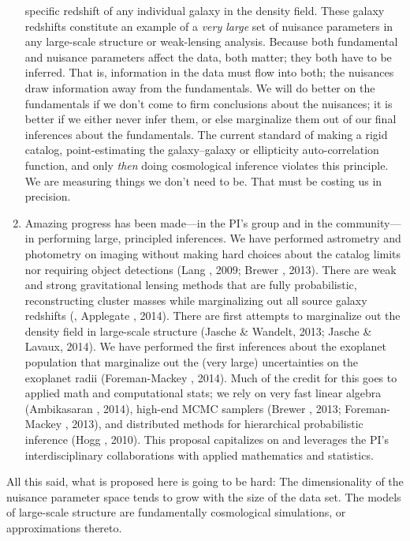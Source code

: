 \documentclass[12pt]{article}
\begin{document}
\begin{enumerate}
specific redshift of any individual galaxy in the density field.
These galaxy redshifts constitute an example of a \emph{very large}
set of nuisance parameters in any large-scale structure or
weak-lensing analysis.
Because both fundamental and nuisance parameters affect the data, both
matter; they both have to be inferred.
That is, information in the data must flow into both; the nuisances
draw information away from the fundamentals.
We will do better on the fundamentals if we don't come to firm
conclusions about the nuisances; it is better if we either never infer
them, or else marginalize them out of our final inferences about the
fundamentals.
The current standard of making a rigid catalog, point-estimating the
galaxy--galaxy or ellipticity auto-correlation function, and only
\emph{then} doing cosmological inference violates this principle.
We are measuring things we don't need to be.
That must be costing us in precision.
\item
Amazing progress has been made---in the PI's group and in the
community---in performing large, principled inferences.
We have performed astrometry and photometry on imaging without making
hard choices about the catalog limits nor requiring object detections
(Lang \etal, 2009; Brewer \etal, 2013).
There are weak and strong gravitational lensing methods that are fully
probabilistic, reconstructing cluster masses while marginalizing out
all source galaxy redshifts (\eg, Applegate \etal, 2014).
There are first attempts to marginalize out the density field in
large-scale structure (Jasche \& Wandelt, 2013; Jasche \& Lavaux, 2014).
We have performed the first inferences about the exoplanet population
that marginalize out the (very large) uncertainties on the exoplanet
radii (Foreman-Mackey \etal, 2014).
Much of the credit for this goes to applied math and computational
stats; we rely on very fast linear algebra (Ambikasaran \etal, 2014), high-end MCMC
samplers (Brewer \etal, 2013; Foreman-Mackey \etal, 2013), and distributed methods
for hierarchical probabilistic inference (Hogg \etal, 2010).
This proposal capitalizes on and leverages the PI's interdisciplinary
collaborations with applied mathematics and statistics.
\end{enumerate}

All this said, what is proposed here is going to be hard:
The dimensionality of the nuisance parameter space tends to grow with
the size of the data set.
The models of large-scale structure are fundamentally cosmological
simulations, or approximations thereto.
\end{document}
